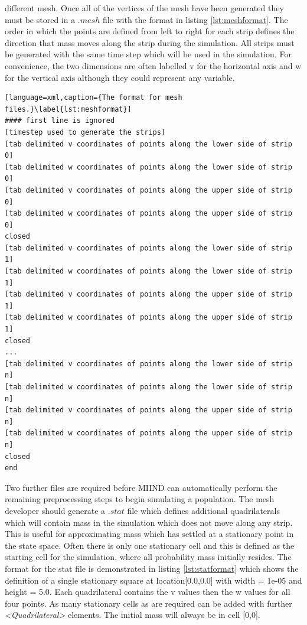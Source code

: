 \documentclass[utf8]{frontiersSCNS} %
\begin{document}
different mesh. Once all of the vertices of the mesh have been generated they must be stored in a $.mesh$ file with the format in listing \ref{lst:meshformat}. The order in which the points are defined from left to right for each strip defines the direction that mass moves along the strip during the simulation. All strips must be generated with the same time step which will be used in the simulation. For convenience, the two dimensions are often labelled v for the horizontal axis and w for the vertical axis although they could represent any variable.

\begin{lstlisting}[language=xml,caption={The format for mesh files.}\label{lst:meshformat}]
#### first line is ignored
[timestep used to generate the strips]
[tab delimited v coordinates of points along the lower side of strip 0]
[tab delimited w coordinates of points along the lower side of strip 0]
[tab delimited v coordinates of points along the upper side of strip 0]
[tab delimited w coordinates of points along the upper side of strip 0]
closed
[tab delimited v coordinates of points along the lower side of strip 1]
[tab delimited w coordinates of points along the lower side of strip 1]
[tab delimited v coordinates of points along the upper side of strip 1]
[tab delimited w coordinates of points along the upper side of strip 1]
closed
...
[tab delimited v coordinates of points along the lower side of strip n]
[tab delimited w coordinates of points along the lower side of strip n]
[tab delimited v coordinates of points along the upper side of strip n]
[tab delimited w coordinates of points along the upper side of strip n]
closed
end
\end{lstlisting}

Two further files are required before MIIND can automatically perform the remaining preprocessing steps to begin simulating a population. The mesh developer should generate a $.stat$ file which defines additional quadrilaterals which will contain mass in the simulation which does not move along any strip. This is useful for approximating mass which has settled at a stationary point in the state space. Often there is only one stationary cell and this is defined as the starting cell for the simulation, where all probability mass initially resides. The format for the stat file is demonstrated in listing \ref{lst:statformat} which shows the definition of a single stationary square at location[0.0,0.0] with width = 1e-05 and height = 5.0. Each quadrilateral contains the v values then the w values for all four points. As many stationary cells as are required can be added with further \textit{\textless Quadrilateral\textgreater} elements. The initial mass will always be in cell [0,0].
\end{document}

